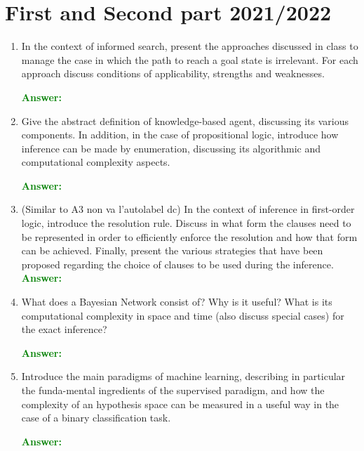 \documentclass[12pt]{article}
\begin{document}
\section{First and Second part 2021/2022}
\begin{enumerate}[label=\textbf{B.\arabic*}]

    \item In the context of informed search, present the approaches discussed in class to manage the case in which the path to reach a goal state is irrelevant. 
    For each approach discuss conditions of applicability, strengths and weaknesses.
    
    \textcolor{green}{\textbf{Answer:}}

    \item Give the abstract definition of knowledge-based agent, discussing its various components. 
    In addition, in the case of propositional logic, introduce how inference can be made by enumeration, discussing its algorithmic and computational complexity aspects.

    \textcolor{green}{\textbf{Answer:}}

    \item (Similar to A3 non va l'autolabel dc) In the context of inference in first-order logic, introduce the resolution rule.
    Discuss in what form the clauses need to be represented in order to efficiently enforce the resolution and how that form can be achieved.
    Finally, present the various strategies that have been proposed regarding the choice of clauses to be used during the inference.
    \textcolor{green}{\textbf{Answer:}}

    \item What does a Bayesian Network consist of? 
    Why is it useful?
    What is its computational complexity in space and time (also discuss special cases) for the exact inference?

    \textcolor{green}{\textbf{Answer:}}

    \item Introduce the main paradigms of machine learning, describing in particular the funda-mental ingredients of the supervised paradigm, and how the complexity of an hypothesis space can be measured in a useful way in the case of a binary classification task.

    \textcolor{green}{\textbf{Answer:}}

\end{enumerate}
\end{document}
